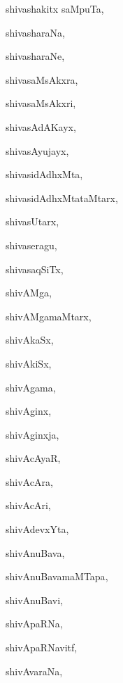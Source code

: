 \begin{multicols}{3}
{\noindent
{shivashakitx saMpuTa}, \pageref{shivashakitxsaMpuTa}

\noindent
{shivasharaNa}, \pageref{shivasharaNa}

\noindent
{shivasharaNe}, \pageref{shivasharaNe}

\noindent
{shivasaMsAkxra}, \pageref{shivasaMsAkxra}

\noindent
{shivasaMsAkxri}, \pageref{shivasaMsAkxri}

\noindent
{shivasAdAKayx}, \pageref{shivasAdAKayx}

\noindent
{shivasAyujayx}, \pageref{shivasAyujayx}

\noindent
{shivasidAdhxMta}, \pageref{shivasidAdhxMta}

\noindent
{shivasidAdhxMtataMtarx}, \pageref{shivasidAdhxMtataMtarx}

\noindent
{shivasUtarx}, \pageref{shivasUtarx}

\noindent
{shivaseragu}, \pageref{shivaseragu}

\noindent
{shivasaqSiTx}, \pageref{shivasaqSiTx}

\noindent
{shivAMga}, \pageref{shivAMga}

\noindent
{shivAMgamaMtarx}, \pageref{shivAMgamaMtarx}

\noindent
{shivAkaSx}, \pageref{shivAkaSx}

\noindent
{shivAkiSx}, \pageref{shivAkiSx}

\noindent
{shivAgama}, \pageref{shivAgama}

\noindent
{shivAginx}, \pageref{shivAginx}

\noindent
{shivAginxja}, \pageref{shivAginxja}

\noindent
{shivAcAyaR}, \pageref{shivAcAyaR}

\noindent
{shivAcAra}, \pageref{shivAcAra}

\noindent
{shivAcAri}, \pageref{shivAcAri}

\noindent
{shivAdevxYta}, \pageref{shivAdevxYta}

\noindent
{shivAnuBava}, \pageref{shivAnuBava}

\noindent
{shivAnuBavamaMTapa}, \pageref{shivAnuBavamaMTapa}

\noindent
{shivAnuBavi}, \pageref{shivAnuBavi}

\noindent
{shivApaRNa}, \pageref{shivApaRNa}

\noindent
{shivApaRNavitf}, \pageref{shivApaRNavitf}

\noindent
{shivAvaraNa}, \pageref{shivAvaraNa}

}
\end{multicols}
